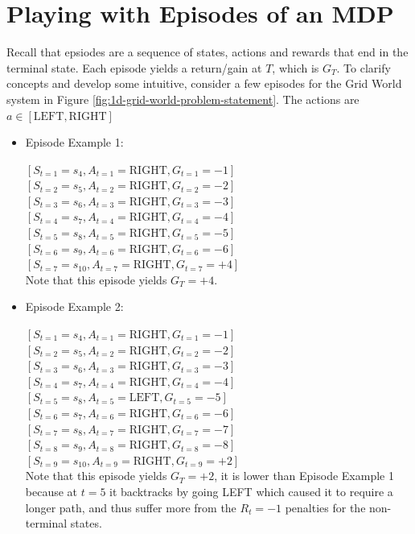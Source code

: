 \documentclass[a4paper,11pt]{article}
\begin{document}
\section{Playing with Episodes of an MDP}

Recall that epsiodes are a sequence of states, actions and rewards that end in the terminal state.  Each episode yields a return/gain at $T$, which is $G_T$.  To clarify concepts and develop some intuitive, consider a few episodes for the Grid World system in Figure \ref{fig:1d-grid-world-problem-statement}.  The actions are $a \in [\text{LEFT}, \text{RIGHT}]$

\begin{itemize}
  \item Episode Example 1:
  
  $[S_{t=1} = s_4, A_{t=1} = \text{RIGHT}, G_{t=1}=-1]$ \\
  $[S_{t=2} = s_5, A_{t=2} = \text{RIGHT}, G_{t=2}=-2]$ \\
  $[S_{t=3} = s_6, A_{t=3} = \text{RIGHT}, G_{t=3}=-3]$ \\
  $[S_{t=4} = s_7, A_{t=4} = \text{RIGHT}, G_{t=4}=-4]$ \\
  $[S_{t=5} = s_8, A_{t=5} = \text{RIGHT}, G_{t=5}=-5]$ \\
  $[S_{t=6} = s_9, A_{t=6} = \text{RIGHT}, G_{t=6}=-6]$ \\
  $[S_{t=7} = s_10, A_{t=7} = \text{RIGHT}, G_{t=7}=+4]$ \\

  Note that this episode yields $G_T = +4$.

  \item Episode Example 2:
  
  $[S_{t=1} = s_4, A_{t=1} = \text{RIGHT}, G_{t=1}=-1]$ \\
  $[S_{t=2} = s_5, A_{t=2} = \text{RIGHT}, G_{t=2}=-2]$ \\
  $[S_{t=3} = s_6, A_{t=3} = \text{RIGHT}, G_{t=3}=-3]$ \\
  $[S_{t=4} = s_7, A_{t=4} = \text{RIGHT}, G_{t=4}=-4]$ \\
  $[S_{t=5} = s_8, A_{t=5} = \text{LEFT}, G_{t=5}=-5]$ \\
  $[S_{t=6} = s_7, A_{t=6} = \text{RIGHT}, G_{t=6}=-6]$ \\
  $[S_{t=7} = s_8, A_{t=7} = \text{RIGHT}, G_{t=7}=-7]$ \\
  $[S_{t=8} = s_9, A_{t=8} = \text{RIGHT}, G_{t=8}=-8]$ \\
  $[S_{t=9} = s_10, A_{t=9} = \text{RIGHT}, G_{t=9}=+2]$ \\
  
  Note that this episode yields $G_T = +2$, it is lower than Episode Example 1 because at $t=5$ it backtracks by going LEFT which caused it to require a longer path, and thus suffer more from the $R_t = -1$ penalties for the non-terminal states.
\end{itemize}
\end{document}
